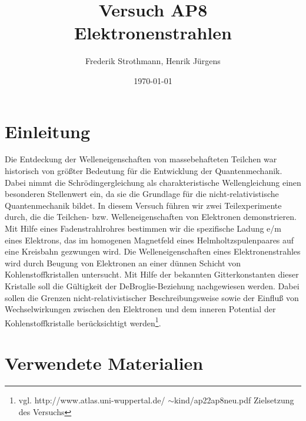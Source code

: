 \documentclass[12pt,a4paper]{article}
\title{Versuch AP8\\ Elektronenstrahlen}
\author{Frederik Strothmann, Henrik Jürgens}
\date{\today}
\begin{document}
\maketitle
\newpage
\tableofcontents
\newpage
\section{Einleitung}
Die Entdeckung der Welleneigenschaften von massebehafteten Teilchen war historisch von größter Bedeutung
für die Entwicklung der Quantenmechanik. Dabei nimmt die Schrödingergleichung als charakteristische Wellengleichung einen besonderen Stellenwert ein, da sie die Grundlage für die nicht-relativistische Quantenmechanik
bildet. In diesem Versuch führen wir zwei Teilexperimente durch, die die Teilchen- bzw. Welleneigenschaften von Elektronen demonstrieren. Mit Hilfe eines Fadenstrahlrohres bestimmen wir die spezifische Ladung e/m eines Elektrons, das im homogenen Magnetfeld eines Helmholtzspulenpaares auf eine Kreisbahn gezwungen wird.
Die Welleneigenschaften eines Elektronenstrahles wird durch Beugung von Elektronen an einer dünnen Schicht von Kohlenstoffkristallen untersucht. Mit Hilfe der bekannten Gitterkonstanten dieser Kristalle soll die Gültigkeit der DeBroglie-Beziehung nachgewiesen werden. Dabei sollen die Grenzen nicht-relativistischer Beschreibungsweise sowie der Einfluß von Wechselwirkungen zwischen den Elektronen und dem inneren Potential der Kohlenstoffkristalle berücksichtigt werden\footnote{vgl. http://www.atlas.uni-wuppertal.de/
$\sim$kind/ap22ap8neu.pdf Zielsetzung des Versuchs}.
\section{Verwendete Materialien}
\end{document}
